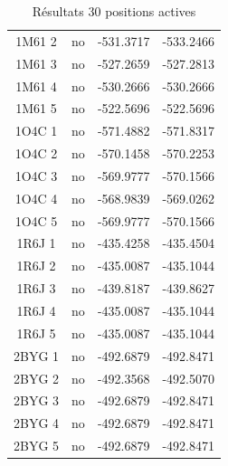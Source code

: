 \documentclass[a4paper,12pt]{article}
\begin{document}
\begin{table}[!htbp]
\begin{tabular}{|c|c|c|c|}
        1M61 2 & no & -531.3717 & -533.2466 \\
        1M61 3 & no & -527.2659 & -527.2813 \\
        1M61 4 & no & -530.2666 & -530.2666 \\
        1M61 5 & no & -522.5696 & -522.5696 \\
        1O4C 1 & no & -571.4882 & -571.8317 \\
        1O4C 2 & no & -570.1458 & -570.2253 \\
        1O4C 3 & no & -569.9777 & -570.1566 \\
        1O4C 4 & no & -568.9839 & -569.0262 \\
        1O4C 5 & no & -569.9777 & -570.1566 \\
        1R6J 1 & no & -435.4258 & -435.4504 \\
        1R6J 2 & no & -435.0087 & -435.1044 \\
        1R6J 3 & no & -439.8187 & -439.8627 \\
        1R6J 4 & no & -435.0087 & -435.1044 \\
        1R6J 5 & no & -435.0087 & -435.1044 \\
        2BYG 1 & no & -492.6879 & -492.8471 \\
        2BYG 2 & no & -492.3568 & -492.5070 \\
        2BYG 3 & no & -492.6879 & -492.8471 \\
        2BYG 4 & no & -492.6879 & -492.8471 \\
        2BYG 5 & no & -492.6879 & -492.8471 \\
        
        \hline



 \end{tabular}      
 \caption{Résultats 30 positions actives }
 \label{tab_echec2BYG__1}      
\end{table}
\end{document}

